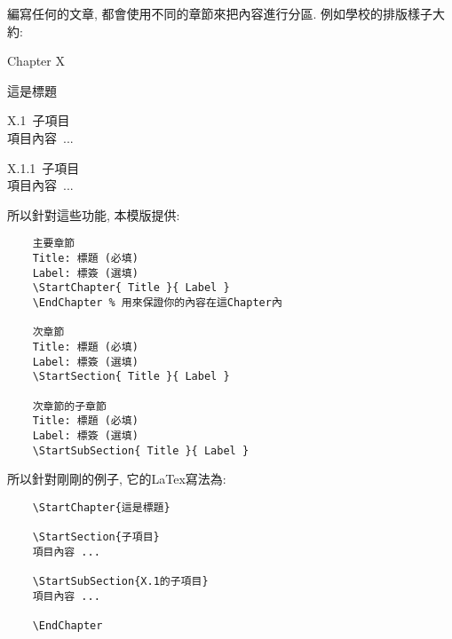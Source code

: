 

編寫任何的文章, 都會使用不同的章節來把內容進行分區. 例如學校的排版樣子大約:

  \EmptyLine
\begin{fmpage}{\textwidth}
  \centerline{\LARGE Chapter X}
  \vspace{0.2cm}
  \centerline{\LARGE 這是標題}

  \vspace{0.5cm}
  \mbox{\Large X.1 子項目}\\
  \mbox{\hspace{1.2cm}項目內容 ...}

  \vspace{0.3cm}
  \mbox{\large X.1.1 子項目}\\
  \mbox{\hspace{1.2cm}項目內容 ...}
\end{fmpage}
  \EmptyLine

所以針對這些功能, 本模版提供:

  \EmptyLine
\begin{fmpage}{\textwidth}
  \begin{verbatim}
    主要章節
    Title: 標題 (必填)
    Label: 標簽 (選填)
    \StartChapter{ Title }{ Label }
    \EndChapter % 用來保證你的內容在這Chapter內

    次章節
    Title: 標題 (必填)
    Label: 標簽 (選填)
    \StartSection{ Title }{ Label }

    次章節的子章節
    Title: 標題 (必填)
    Label: 標簽 (選填)
    \StartSubSection{ Title }{ Label }
  \end{verbatim}
\end{fmpage}
  \EmptyLine

所以針對剛剛的例子, 它的LaTex寫法為:

  \EmptyLine
\begin{fmpage}{\textwidth}
  \begin{verbatim}
    \StartChapter{這是標題}

    \StartSection{子項目}
    項目內容 ...

    \StartSubSection{X.1的子項目}
    項目內容 ...

    \EndChapter
  \end{verbatim}
\end{fmpage}

